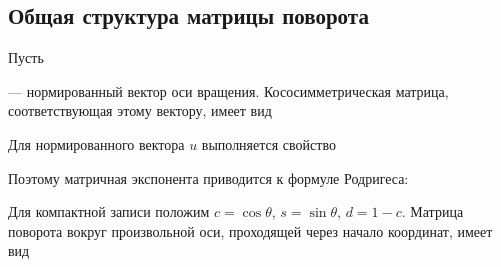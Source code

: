 \documentclass[a4paper,14pt]{extarticle}
\begin{document}
\subsection*{Общая структура матрицы поворота}

Пусть

\begin{center}\end{center}

— нормированный вектор оси вращения. Кососимметрическая матрица, соответствующая этому вектору, имеет вид

\begin{center}\end{center}

Для нормированного вектора $u$ выполняется свойство

\begin{center}\end{center}

Поэтому матричная экспонента приводится к формуле Родригеса:

\begin{center}\end{center}

Для компактной записи положим $c=\cos\theta$, $s=\sin\theta$, $d=1-c$. Матрица поворота вокруг произвольной оси, проходящей через начало координат, имеет вид

\begin{center}\end{center}
\end{document}

